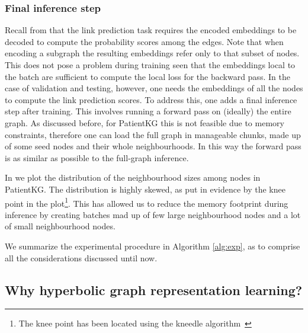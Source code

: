 \subsubsection{Final inference step}
Recall from  that the link prediction task requires the encoded embeddings to be decoded to compute the probability scores among the edges. Note that when encoding a subgraph the resulting embeddings refer only to that subset of nodes. This does not pose a problem during training seen that the embeddings local to the batch are sufficient to compute the local loss for the backward pass. In the case of validation and testing, however, one needs the embeddings of all the nodes to compute the link prediction scores. To address this, one adds a final inference step after training. This involves running a forward pass on (ideally) the entire graph. As discussed before, for PatientKG this is not feasible due to memory constraints, therefore one can load the full graph in manageable chunks, made up of some seed nodes and their whole neighbourhoods. In this way the forward pass is as similar as possible to the full-graph inference. 

In  we plot the distribution of the neighbourhood sizes among nodes in PatientKG. The distribution is highly skewed, as put in evidence by the knee point in the plot\footnote{The knee point has been located using the kneedle algorithm~\cite{satopaa2011KneePointDetection}}. This has allowed us to reduce the memory footprint during inference by creating batches mad up of few large neighbourhood nodes and a lot of small neighbourhood nodes. 

\medskip
We summarize the experimental procedure in Algorithm \ref{alg:exp}, as to comprise all the considerations discussed until now.





\subsection{Why hyperbolic graph representation learning?}\label{sec:hypPatientKG}

